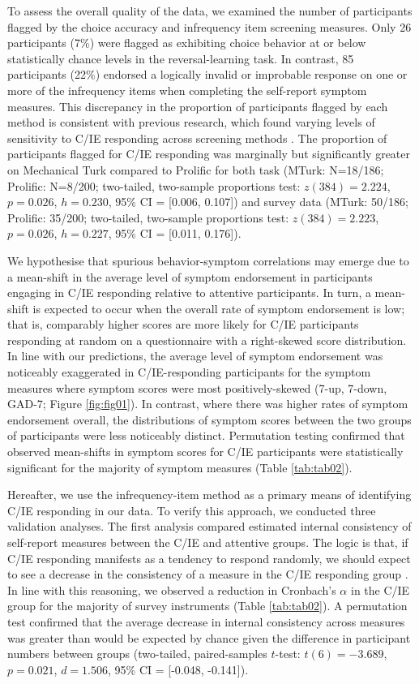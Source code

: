 \documentclass[a4paper,notitlepage,12pt]{article}
\begin{document}
To assess the overall quality of the data, we examined the number of participants flagged by the choice accuracy and infrequency item screening measures. Only 26 participants (7\%) were flagged as exhibiting choice behavior at or below statistically chance levels in the reversal-learning task. In contrast, 85 participants (22\%) endorsed a logically invalid or improbable response on one or more of the infrequency items when completing the self-report symptom measures. This discrepancy in the proportion of participants flagged by each method is consistent with previous research, which found varying levels of sensitivity to C/IE responding across screening methods \cite{desimone2018dirty}. The proportion of participants flagged for C/IE responding was marginally but significantly greater on Mechanical Turk compared to Prolific for both task (MTurk: N=18/186; Prolific: N=8/200; two-tailed, two-sample proportions test: $z(384)=2.224$, $p=0.026$, $h=0.230$, 95\% CI = [0.006, 0.107]) and survey data (MTurk: 50/186; Prolific: 35/200; two-tailed, two-sample proportions test: $z(384)=2.223$, $p=0.026$, $h=0.227$, 95\% CI = [0.011, 0.176]).

We hypothesise that spurious behavior-symptom correlations may emerge due to a mean-shift in the average level of symptom endorsement in participants engaging in C/IE responding relative to attentive participants. In turn, a mean-shift is expected to occur when the overall rate of symptom endorsement is low; that is, comparably higher scores are more likely for C/IE participants responding at random on a questionnaire with a right-skewed score distribution. In line with our predictions, the average level of symptom endorsement was noticeably exaggerated in C/IE-responding participants for the symptom measures where symptom scores were most positively-skewed (7-up, 7-down, GAD-7; Figure \ref{fig:fig01}). In contrast, where there was higher rates of symptom endorsement overall, the distributions of symptom scores between the two groups of participants were less noticeably distinct. Permutation testing confirmed that observed mean-shifts in symptom scores for C/IE participants were statistically significant for the majority of symptom measures (Table \ref{tab:tab02}).

Hereafter, we use the infrequency-item method as a primary means of identifying C/IE responding in our data. To verify this approach, we conducted three validation analyses. The first analysis compared estimated internal consistency of self-report measures between the C/IE and attentive groups. The logic is that, if C/IE responding manifests as a tendency to respond randomly, we should expect to see a decrease in the consistency of a measure in the C/IE responding group \cite{maniaci2014caring, desimone2018dirty, desimone2018differential}. In line with this reasoning, we observed a reduction in Cronbach's $\alpha$ in the C/IE group for the majority of survey instruments (Table \ref{tab:tab02}). A permutation test confirmed that the average decrease in internal consistency across measures was greater than would be expected by chance given the difference in participant numbers between groups (two-tailed, paired-samples $t$-test: $t(6)=-3.689$, $p=0.021$, $d=1.506$, 95\% CI = [-0.048, -0.141]). 
\end{document}
